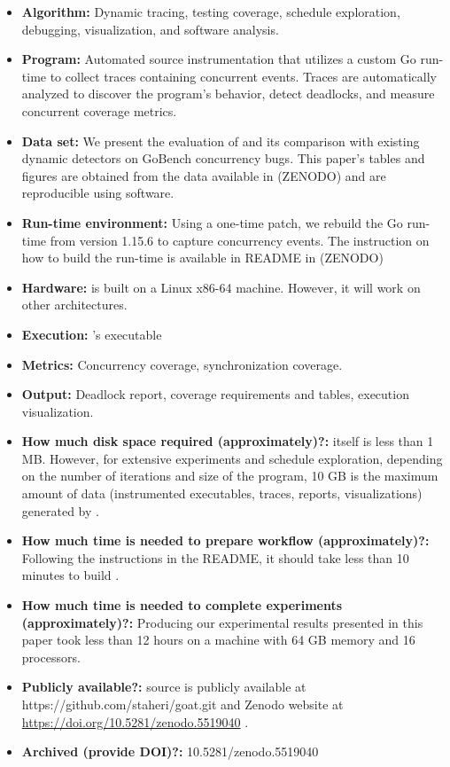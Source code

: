 {\small
\begin{itemize}
  \item {\bf Algorithm: }Dynamic tracing, testing coverage, schedule exploration, debugging, visualization, and software analysis.
  \item {\bf Program: } Automated source instrumentation that utilizes a custom Go run-time to collect traces containing concurrent events. Traces are automatically analyzed to discover the program's behavior, detect deadlocks, and measure concurrent coverage metrics.
  \item {\bf Data set: } We present the evaluation of \goat and its comparison with existing dynamic detectors on GoBench \cite{yuan-gobench-cgo21} concurrency bugs. This paper's tables and figures are obtained from the data available in (ZENODO) and are reproducible using \goat software.
  \item {\bf Run-time environment: } Using a one-time patch, we rebuild the Go run-time from version 1.15.6 to capture concurrency events. The instruction on how to build the run-time is available in README in (ZENODO)
  \item {\bf Hardware: } \goat is built on a Linux x86-64 machine. However, it will work on other architectures.
  \item {\bf Execution: } \goat's executable
  \item {\bf Metrics: } Concurrency coverage, synchronization coverage.
  \item {\bf Output: } Deadlock report, coverage requirements and tables, execution visualization.
  \item {\bf How much disk space required (approximately)?: } \goat itself is less than 1 MB. However, for extensive experiments and schedule exploration, depending on the number of iterations and size of the program, 10 GB is the maximum amount of data (instrumented executables, traces, reports, visualizations) generated by \goat.
  \item {\bf How much time is needed to prepare workflow (approximately)?: } Following the instructions in the README, it should take less than 10 minutes to build \goat.
  \item {\bf How much time is needed to complete experiments (approximately)?: } Producing our experimental results presented in this paper took less than 12 hours on a machine with 64 GB memory and 16 processors.
  \item {\bf Publicly available?: } \goat source is publicly available at \textsf{https://github.com/staheri/goat.git} and Zenodo website at \href{https://doi.org/10.5281/zenodo.5519040}{https://doi.org/10.5281/zenodo.5519040} \cite{goat_artifact}.
  \item {\bf Archived (provide DOI)?: } 10.5281/zenodo.5519040
\end{itemize}

}
